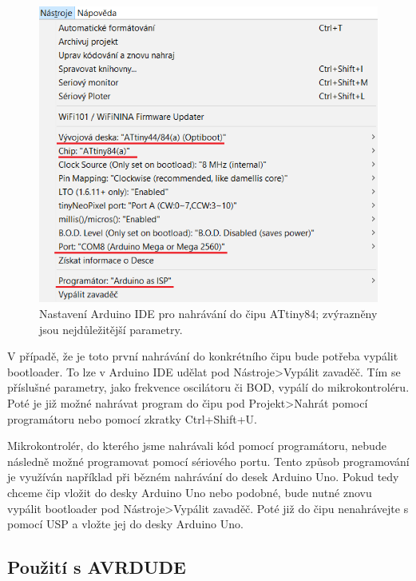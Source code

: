 \documentclass[11pt,a4paper,twoside,openright]{report}
\begin{document}
\begin{figure}[ht!]
  \includegraphics[width=0.6\linewidth]{img/settings.png}
  \centering
  \caption{Nastavení Arduino IDE pro nahrávání do čipu ATtiny84; zvýrazněny jsou nejdůležitější parametry.}
  \label{fig:attiny84_settings}
\end{figure}


V případě, že je toto první nahrávání do konkrétního čipu bude potřeba vypálit bootloader. To lze v Arduino IDE udělat pod Nástroje>Vypálit zavaděč. Tím se příslušné parametry, jako frekvence oscilátoru či BOD, vypálí do mikrokontroléru. Poté je již možné nahrávat program do čipu pod Projekt>Nahrát pomocí programátoru nebo pomocí zkratky Ctrl+Shift+U. 

Mikrokontrolér, do kterého jsme nahrávali kód pomocí programátoru, nebude následně možné programovat pomocí sériového portu. Tento způsob programování je využíván například při bězném nahrávání do desek Arduino Uno. Pokud tedy chceme čip vložit do desky Arduino Uno nebo podobné, bude nutné znovu vypálit bootloader pod Nástroje>Vypálit zavaděč. Poté již do čipu nenahrávejte s pomocí USP a vložte jej do desky Arduino Uno.

\subsection {Použití s AVRDUDE}
\end{document}
